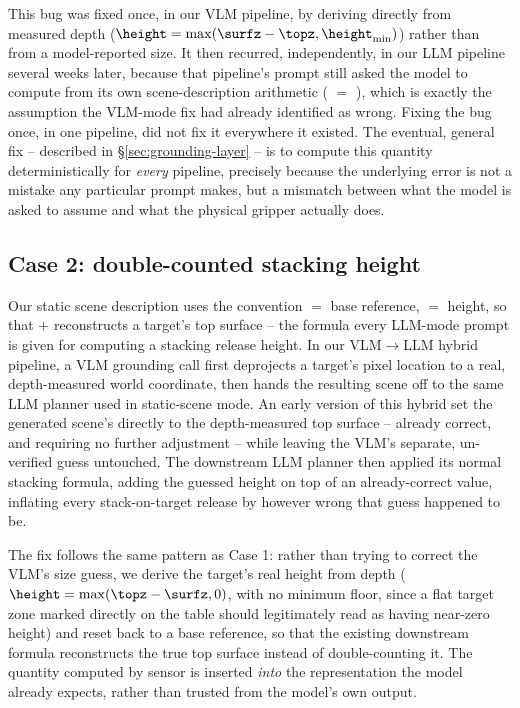 This bug was fixed once, in our VLM pipeline, by deriving
 directly from measured depth
($\height = \max(\surfz - \topz, \height_{\min})$) rather than from a
model-reported size. It then recurred, independently, in our LLM pipeline
several weeks later, because that pipeline's prompt still asked the model
to compute  from its own scene-description arithmetic
( $=$ ), which is exactly the assumption
the VLM-mode fix had already identified as wrong. Fixing the bug once, in
one pipeline, did not fix it everywhere it existed. The eventual,
general fix -- described in \S\ref{sec:grounding-layer} -- is to compute
this quantity deterministically for \emph{every} pipeline, precisely
because the underlying error is not a mistake any particular prompt makes,
but a mismatch between what the model is asked to assume and what the
physical gripper actually does.

\subsection{Case 2: double-counted stacking height}
\label{sec:case-double-count}

Our static scene description uses the convention
 $=$ base reference,  $=$ height, so that
 $+$  reconstructs a target's top surface --
the formula every LLM-mode prompt is given for computing a stacking
release height. In our VLM$\to$LLM hybrid pipeline, a VLM grounding call
first deprojects a target's pixel location to a real, depth-measured
world coordinate, then hands the resulting scene off to the same LLM
planner used in static-scene mode. An early version of this hybrid set the
generated scene's  directly to the depth-measured
top surface -- already correct, and requiring no further adjustment --
while leaving the VLM's separate, un-verified  guess
untouched. The downstream LLM planner then applied its normal stacking
formula, adding the guessed height on top of an already-correct value,
inflating every stack-on-target release by however wrong that guess
happened to be.

The fix follows the same pattern as Case 1: rather than trying to correct
the VLM's size guess, we derive the target's real height from depth
($\height = \max(\topz - \surfz, 0)$, with no minimum floor, since a flat
target zone marked directly on the table should legitimately read as
having near-zero height) and reset  back to a base
reference, so that the existing downstream formula reconstructs the true
top surface instead of double-counting it. The quantity computed by
sensor is inserted \emph{into} the representation the model already
expects, rather than trusted from the model's own output.

